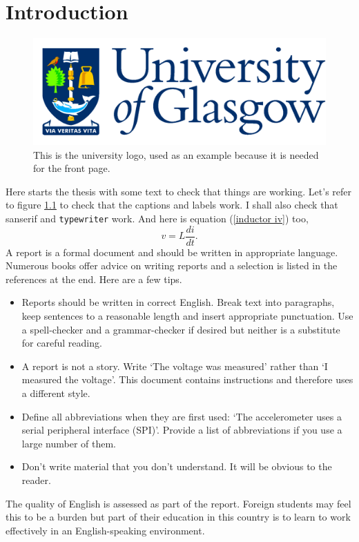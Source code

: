 \chapter{Introduction}

\begin{figure}
\centering
\includegraphics[scale=0.125]{GlaLogo.pdf}
\caption{This is the university logo, used as an example because it is needed for the front page.}
\label{logo figure}
\end{figure}

Here starts the thesis with some text to check that things are working. Let's refer to figure \ref{logo figure} to check that the captions and labels work. I shall also check that \textsf{sanserif} and \texttt{typewriter} work. And here is equation (\ref{inductor iv}) too,
\begin{equation}
v = L \frac{di}{dt} .
\label{inductor iv}
\end{equation}
A report is a formal document and should be written in appropriate language. Numerous books offer advice on writing reports and a selection is listed in the references at the end. Here are a few tips.
\begin{itemize}
\item
Reports should be written in correct English. Break text into paragraphs, keep sentences to a reasonable length and insert appropriate punctuation. Use a spell-checker and a grammar-checker if desired but neither is a substitute for careful reading.
\item
A report is not a story.
Write `The voltage was measured' rather than `I measured the voltage'. This document contains instructions and therefore uses a different style.
\item
Define all abbreviations when they are first used: `The accelerometer uses a serial peripheral interface (SPI)'. Provide a list of abbreviations if you use a large number of them.
\item
Don't write material that you don't understand. It will be obvious to the reader.
\end{itemize}
The quality of English is assessed as part of the report. Foreign students may feel this to be a burden but part of their education in this country is to learn to work effectively in an English-speaking environment.


